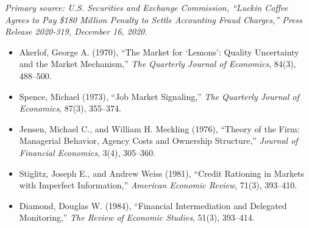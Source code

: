 \emph{Primary source: U.S. Securities and Exchange Commission, ``Luckin Coffee Agrees to Pay \$180 Million Penalty to Settle Accounting Fraud Charges,'' Press Release 2020-319, December 16, 2020.}


\begin{itemize}

\item Akerlof, George A. (1970), ``The Market for `Lemons': Quality Uncertainty and the Market Mechanism,'' \emph{The Quarterly Journal of Economics}, 84(3), 488--500.

\item Spence, Michael (1973), ``Job Market Signaling,'' \emph{The Quarterly Journal of Economics}, 87(3), 355--374.

\item Jensen, Michael C., and William H. Meckling (1976), ``Theory of the Firm: Managerial Behavior, Agency Costs and Ownership Structure,'' \emph{Journal of Financial Economics}, 3(4), 305--360.

\item Stiglitz, Joseph E., and Andrew Weiss (1981), ``Credit Rationing in Markets with Imperfect Information,'' \emph{American Economic Review}, 71(3), 393--410.

\item Diamond, Douglas W. (1984), ``Financial Intermediation and Delegated Monitoring,'' \emph{The Review of Economic Studies}, 51(3), 393--414.

\end{itemize}
